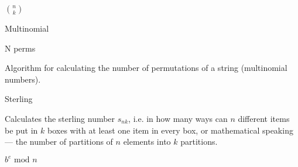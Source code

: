 

\begin{algorithm}{${n \choose k}$}
\end{algorithm}

\begin{algorithm}{Multinomial}
\end{algorithm}

\begin{algorithm}{N perms}

Algorithm for calculating the number of permutations of a string
(multinomial numbers).
\end{algorithm}

\begin{algorithm}{Sterling}

Calculates the sterling number $s_{nk}$, i.e. in how many ways can $n$
different items be put in $k$ boxes with at least one item in every box, or
mathematical speaking --- the number of partitions of $n$ elements into
$k$ partitions.
\end{algorithm}

\begin{algorithm}{$b^e \textrm{ mod } n$}
\end{algorithm}



